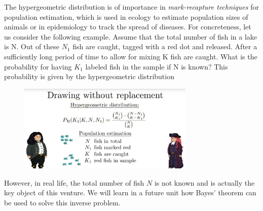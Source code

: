 \documentclass[12pt, a4paper]{scrartcl}
\begin{document}
The hypergeometric distribution is of importance in \textit{mark-recapture techniques} for population estimation, which is used in ecology to estimate population sizes of animals or in epidemiology to track the spread of diseases. 
For concreteness, let us consider the following example. Assume that the total number of fish in a lake is N. Out of these $N_1$ fish are caught, tagged with a red dot and released. After a sufficiently long period of time to allow for mixing K fish are caught.
What is the probability for having $K_1$ labeled fish in the sample if N is known? This probability is given by the hypergeometric distribution
 \begin{figure}[H]
	\centering
	\includegraphics[width=0.75\textwidth]{4_8.png}
\end{figure}
However, in real life, the total number of fish $N$ is not known and is actually the key object of this venture.
We will learn in a future unit how Bayes’ theorem can be used to solve this inverse problem.\\
\end{document}
